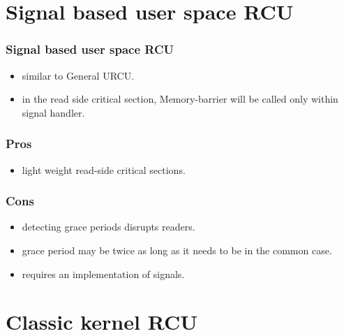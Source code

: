 \documentclass{beamer}
\begin{document}

\section{Signal based user space RCU}


\begin{frame}[t]
  \frametitle{Signal based user space RCU}

  \begin{itemize}
  \item similar to General URCU.
  \item in the read side critical section, Memory-barrier will
    be called only within signal handler.
  \end{itemize}
  
\end{frame}


\begin{frame}[t]
  \frametitle{Pros}

  \begin{itemize}
  \item light weight read-side critical sections.
  \end{itemize}
  
\end{frame}


\begin{frame}[t]
  \frametitle{Cons}

  \begin{itemize}
  \item detecting grace periods disrupts readers.
  \item grace period may be twice as long as it needs to be in the common case.
  \item requires an implementation of signals.
  \end{itemize}

\end{frame}


\section{Classic kernel RCU}
\end{document}
